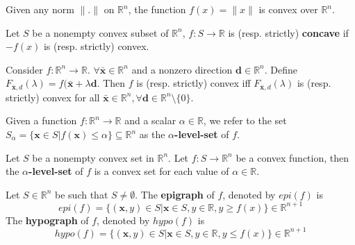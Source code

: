 				\begin{example}
					Given any norm $\|.\|$ on $\mathbb{R}^n$, the function $f(x) = \|x\|$ is convex over $\mathbb{R}^n$.
				\end{example}

				\begin{definition}
					Let $S$ be a nonempty convex subset of $\mathbb{R}^n$, $f: S \rightarrow \mathbb{R}$ is (resp. strictly) \textbf{concave} if $-f(x)$ is (resp. strictly) convex.
				\end{definition}


				\begin{theorem}
					Consider $f: \mathbb{R}^n\rightarrow \mathbb{R}$. $\forall \bar{\mathbf{x}} \in \mathbb{R}^n$ and a nonzero direction $\mathbf{d} \in \mathbb{R}^n$. Define $F_{\bar{\mathbf{x}}, d}(\lambda) = f(\bar{\mathbf{x}} + \lambda \mathbf{d}$. Then $f$ is (resp. strictly) convex iff $F_{\bar{\mathbf{x}}, d}(\lambda)$ is (resp. strictly) convex for all $\bar{\mathbf{x}} \in \mathbb{R}^n, \forall \mathbf{d} \in \mathbb{R}^n \setminus \{0\}$.
				\end{theorem}

				\begin{definition}
					Given a function $f: \mathbb{R}^n \rightarrow \mathbb{R}$ and a scalar $\alpha \in \mathbb{R}$, we refer to the set $S_\alpha = \{\mathbf{x} \in S|f(\mathbf{x}) \le \alpha\} \subseteq \mathbb{R}^n$ as the \textbf{$\alpha$-level-set} of $f$.
				\end{definition}

				\begin{lemma}
					Let $S$ be a nonempty convex set in $\mathbb{R}^n$. Let $f: S\rightarrow \mathbb{R}^n$ be a convex function, then the \textbf{$\alpha$-level-set} of $f$ is a convex set for each value of $\alpha \in \mathbb{R}$.
				\end{lemma}


				\begin{definition}
					Let $S \in \mathbb{R}^n$ be such that $S \neq \emptyset$. The \textbf{epigraph} of $f$, denoted by $epi(f)$ is
					\begin{equation}
						epi(f) = \{(\mathbf{x}, y) \in S|\mathbf{x} \in S, y \in \mathbb{R}, y \ge f(x)\} \in \mathbb{R}^{n+1}
					\end{equation}
					The \textbf{hypograph} of $f$, denoted by $hypo(f)$ is
					\begin{equation}
						hypo(f) = \{(\mathbf{x}, y) \in S|\mathbf{x} \in S, y \in \mathbb{R}, y \le f(x)\} \in \mathbb{R}^{n+1}
					\end{equation}
				\end{definition}

